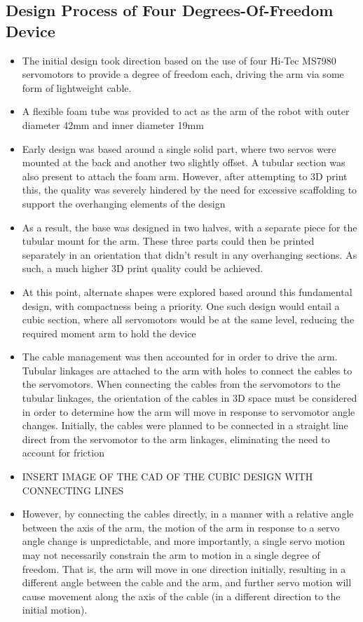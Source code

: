 \documentclass[11pt]{article}
\begin{document}
\subsection{Design Process of Four Degrees-Of-Freedom Device}
\begin{itemize}
\item{The initial design took direction based on the use of four Hi-Tec MS7980 servomotors to provide a degree of freedom each, driving the arm via some form of lightweight cable.}
\item{A flexible foam tube was provided to act as the arm of the robot with outer diameter 42mm and inner diameter 19mm}
\item{Early design was based around a single solid part, where two servos were mounted at the back and another two slightly offset. A tubular section was also present to attach the foam arm. However, after attempting to 3D print this, the quality was severely hindered by the need for excessive scaffolding to support the overhanging elements of the design}
\item{As a result, the base was designed in two halves, with a separate piece for the tubular mount for the arm. These three parts could then be printed separately in an orientation that didn't result in any overhanging sections. As such, a much higher 3D print quality could be achieved.}
\item{At this point, alternate shapes were explored based around this fundamental design, with compactness being a priority. One such design would entail a cubic section, where all servomotors would be at the same level, reducing the required moment arm to hold the device}
\item{The cable management was then accounted for in order to drive the arm. Tubular linkages are attached to the arm with holes to connect the cables to the servomotors. When connecting the cables from the servomotors to the tubular linkages, the orientation of the cables in 3D space must be considered in order to determine how the arm will move in response to servomotor angle changes. Initially, the cables were planned to be connected in a straight line direct from the servomotor to the arm linkages, eliminating the need to account for friction}
\item{INSERT IMAGE OF THE CAD OF THE CUBIC DESIGN WITH CONNECTING LINES}
\item{However, by connecting the cables directly, in a manner with a relative angle between the axis of the arm, the motion of the arm in response to a servo angle change is unpredictable, and more importantly, a single servo motion may not necessarily constrain the arm to motion in a single degree of freedom. That is, the arm will move in one direction initially, resulting in a different angle between the cable and the arm, and further servo motion will cause movement along the axis of the cable (in a different direction to the initial motion). }

\end{itemize}
\end{document}
